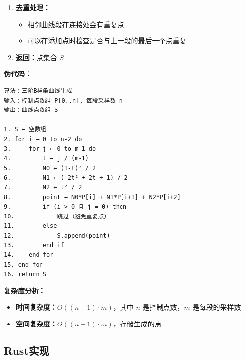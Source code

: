 \documentclass[12pt,a4paper]{article}
\begin{document}
\begin{tcolorbox}[breakable]
\begin{enumerate}
\item \textbf{去重处理：}
  \begin{itemize}
  \item 相邻曲线段在连接处会有重复点
  \item 可以在添加点时检查是否与上一段的最后一个点重复
  \end{itemize}

\item \textbf{返回：}点集合 $S$
\end{enumerate}

\textbf{伪代码：}

\begin{verbatim}
算法：三阶B样条曲线生成
输入：控制点数组 P[0..n], 每段采样数 m
输出：曲线点数组 S

1. S ← 空数组
2. for i ← 0 to n-2 do
3.     for j ← 0 to m-1 do
4.         t ← j / (m-1)
5.         N0 ← (1-t)² / 2
6.         N1 ← (-2t² + 2t + 1) / 2
7.         N2 ← t² / 2
8.         point ← N0*P[i] + N1*P[i+1] + N2*P[i+2]
9.         if (i > 0 且 j = 0) then
10.            跳过（避免重复点）
11.        else
12.            S.append(point)
13.        end if
14.    end for
15. end for
16. return S
\end{verbatim}

\textbf{复杂度分析：}

\begin{itemize}
\item \textbf{时间复杂度：}$O((n-1) \cdot m)$，其中 $n$ 是控制点数，$m$ 是每段的采样数
\item \textbf{空间复杂度：}$O((n-1) \cdot m)$，存储生成的点
\end{itemize}
\end{tcolorbox}

\subsection{Rust实现}
\end{document}
